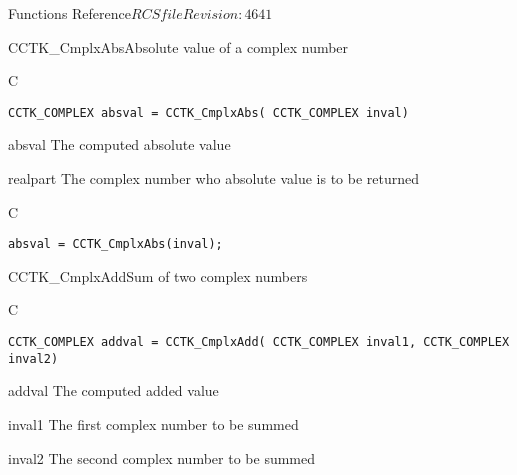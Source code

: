 \begin{cactuspart}{ Functions Reference}{$RCSfile$}{$Revision: 4641 $}
\begin{FunctionDescription}{CCTK\_CmplxAbs}{Absolute value of a complex number}
\label{CCTK-CmplxAbs}
\begin{SynopsisSection}
\begin{Synopsis}{C}
\begin{verbatim}CCTK_COMPLEX absval = CCTK_CmplxAbs( CCTK_COMPLEX inval)\end{verbatim}
\end{Synopsis}
\end{SynopsisSection}
\begin{ParameterSection}
\begin{Parameter}{absval}
The computed absolute value
\end{Parameter}
\begin{Parameter}{realpart}
The complex number who absolute value is to be returned
\end{Parameter}
\end{ParameterSection}

\begin{ExampleSection}
\begin{Example}{C}
\begin{verbatim}
absval = CCTK_CmplxAbs(inval);
\end{verbatim}
\end{Example}
\end{ExampleSection}
\end{FunctionDescription}


\begin{FunctionDescription}{CCTK\_CmplxAdd}{Sum of two complex numbers}
\label{CCTK-CmplxAdd}
\begin{SynopsisSection}
\begin{Synopsis}{C}
\begin{verbatim}CCTK_COMPLEX addval = CCTK_CmplxAdd( CCTK_COMPLEX inval1, CCTK_COMPLEX inval2)\end{verbatim}
\end{Synopsis}
\end{SynopsisSection}
\begin{ParameterSection}
\begin{Parameter}{addval}
The computed added value
\end{Parameter}
\begin{Parameter}{inval1}
The first complex number to be summed
\end{Parameter}
\begin{Parameter}{inval2}
The second complex number to be summed
\end{Parameter}
\end{ParameterSection}


\end{FunctionDescription}
\end{cactuspart}

